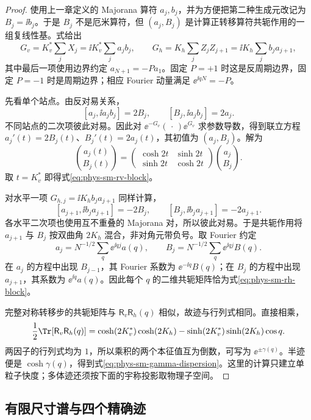 \begin{proof}
使用上一章定义的 Majorana 算符 \(a_j,b_j\)，并为方便把第二种生成元改记为 \(B_j=\ii b_j\)。于是 \(B_j\) 不是厄米算符，但 \((a_j,B_j)\) 是计算正转移算符共轭作用的一组复线性基。式给出
\[
G_v=K_v^*\sum_j X_j=\ii K_v^*\sum_j a_jb_j,\qquad
G_h=K_h\sum_j Z_jZ_{j+1}
=\ii K_h\sum_j b_ja_{j+1},
\]
其中最后一项使用边界约定 \(a_{N+1}=-P a_1\)。固定 \(P=+1\) 时这是反周期边界，固定 \(P=-1\) 时是周期边界；相应 Fourier 动量满足 \(\ee^{\ii qN}=-P\)。

先看单个站点。由反对易关系，
\[
[a_j,\ii a_jb_j]=2B_j,\qquad
[B_j,\ii a_jb_j]=2a_j.
\]
不同站点的二次项彼此对易。因此对 \(\ee^{-G_v}(\,\cdot\,)\ee^{G_v}\) 求参数导数，得到联立方程
\(a_j'(t)=2B_j(t)\)、\(B_j'(t)=2a_j(t)\)，其初值为 \((a_j,B_j)\)。解为
\[
\binom{a_j(t)}{B_j(t)}
=\begin{pmatrix}\cosh2t&\sinh2t\\
\sinh2t&\cosh2t\end{pmatrix}
\binom{a_j}{B_j}.
\]
取 \(t=K_v^*\) 即得式\cref{eq:phys-sm-rv-block}。

对水平一项 \(G_{h,j}=\ii K_h b_ja_{j+1}\) 同样计算，
\[
[a_{j+1},\ii b_ja_{j+1}]=-2B_j,\qquad
[B_j,\ii b_ja_{j+1}]=-2a_{j+1}.
\]
各水平二次项也使用互不重叠的 Majorana 对，所以彼此对易。于是共轭作用将 \(a_{j+1}\) 与 \(B_j\) 按双曲角 \(2K_h\) 混合，非对角元带负号。取 Fourier 约定
\[
a_j=N^{-1/2}\sum_q\ee^{\ii qj}a(q),\qquad
B_j=N^{-1/2}\sum_q\ee^{\ii qj}B(q).
\]
在 \(a_j\) 的方程中出现 \(B_{j-1}\)，其 Fourier 系数为 \(\ee^{-\ii q}B(q)\)；在 \(B_j\) 的方程中出现 \(a_{j+1}\)，其系数为 \(\ee^{\ii q}a(q)\)。因此每个 \(q\) 的二维共轭矩阵恰为式\cref{eq:phys-sm-rh-block}。

完整对称转移步的共轭矩阵与 \(\mathsf R_v\mathsf R_h(q)\) 相似，故迹与行列式相同。直接相乘，
\[
\frac12\Tr[\mathsf R_v\mathsf R_h(q)]
=\cosh(2K_v^*)\cosh(2K_h)
-\sinh(2K_v^*)\sinh(2K_h)\cos q.
\]
两因子的行列式均为 \(1\)，所以乘积的两个本征值互为倒数，可写为 \(\ee^{\pm\gamma(q)}\)。半迹便是 \(\cosh\gamma(q)\)，得到式\cref{eq:phys-sm-gamma-dispersion}。这里的计算只建立单粒子快度；多体迹还须按下面的宇称投影取物理子空间。
\end{proof}

\subsection{有限尺寸谱与四个精确迹}

